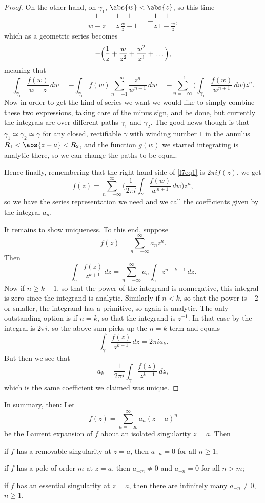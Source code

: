 \begin{proof}
	On the other hand, on $\gamma_1$, $\abs{w} < \abs{z}$, so this time
	\[
		\frac{1}{w - z} = \frac{1}{z} \frac{1}{\frac{w}{z} - 1} = - \frac{1}{z} \frac{1}{1 - \frac{w}{z}},
	\]
	which as a geometric series becomes
	\[
		- \Bigl ( \frac{1}{z} + \frac{w}{z^2} + \frac{w^2}{z^3} + \dots \Bigr ),
	\]
	meaning that
	\[
		\int_{\gamma_1} \frac{f(w)}{w - z} \, d w = - \int_{\gamma_1} f(w) \sum_{n = -1}^{-\infty} \frac{z^n}{w^{n + 1}} \, d w = - \sum_{n = -\infty}^{-1} \biggl ( \int_{\gamma_1} \frac{f(w)}{w^{n + 1}} \, d w \biggr ) z^n.
	\]
	Now in order to get the kind of series we want we would like to simply combine these two expressions, taking care of the minus sign, and be done, but currently the integrals are over different paths $\gamma_1$ and $\gamma_2$.
	The good news though is that $\gamma_1 \simeq \gamma_2 \simeq \gamma$ for any closed, rectifiable $\gamma$ with winding number $1$ in the annulus $R_1 < \abs{z - a} < R_2$, and the function $g(w)$ we started integrating is analytic there, so we can change the paths to be equal.

	Hence finally, remembering that the right-hand side of \autoref{l7eq1} is $2 \pi i f(z)$, we get
	\[
		f(z) = \sum_{n = -\infty}^\infty \biggl ( \frac{1}{2 \pi i} \int_\gamma \frac{f(w)}{w^{n + 1}} \, d w \biggr ) z^n,
	\]
	so we have the series representation we need and we call the coefficients given by the integral $a_n$.

	It remains to show uniqueness.
	To this end, suppose
	\[
		f(z) = \sum_{n = -\infty}^\infty a_n z^n.
	\]
	Then
	\[
		\int_\gamma \frac{f(z)}{z^{k + 1}} \, d z = \sum_{n = -\infty}^{\infty} a_n \int_\gamma z^{n - k - 1} \, d z.
	\]
	Now if $n \geq k + 1$, so that the power of the integrand is nonnegative, this integral is zero since the integrand is analytic.
	Similarly if $n < k$, so that the power is $-2$ or smaller, the integrand has a primitive, so again is analytic.
	The only outstanding option is if $n = k$, so that the integrand is $z^{-1}$.
	In that case by  the integral is $2 \pi i$, so the above sum picks up the $n = k$ term and equals
	\[
		\int_\gamma \frac{f(z)}{z^{k + 1}} \, d z = 2 \pi i a_k.
	\]
	But then we see that
	\[
		a_k = \frac{1}{2 \pi i} \int_\gamma \frac{f(z)}{z^{k + 1}} \, d z,
	\]
	which is the same coefficient we claimed was unique.
\end{proof}

In summary, then:
Let
\[
	f(z) = \sum_{n = -\infty}^\infty a_n (z - a)^n
\]
be the Laurent expansion of $f$ about an isolated singularity $z = a$.
Then
\begin{items}
	\item if $f$ has a removable singularity at $z = a$, then $a_{-n} = 0$ for all $n \geq 1$;
	\item if $f$ has a pole of order $m$ at $z = a$, then $a_{-m} \neq 0$ and $a_{-n} = 0$ for all $n > m$;
	\item if $f$ has an essential singularity at $z = a$, then there are infinitely many $a_{-n} \neq 0$, $n \geq 1$.
\end{items}

